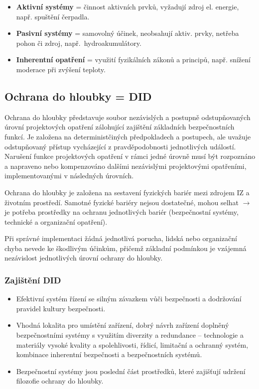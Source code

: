\begin{itemize}
    \item \textbf{Aktivní systémy} = činnost aktivních prvků, vyžadují zdroj el. energie, např. spuštění čerpadla.
    \item  \textbf{Pasivní systémy} = samovolný účinek, neobsahují aktiv. prvky, netřeba pohon či zdroj, např.~hydroakumulátory.
    \item  \textbf{Inherentní opatření} = využití fyzikálních zákonů a principů, např. snížení moderace při zvýšení teploty.
\end{itemize}

\subsection{Ochrana do hloubky = DID}

Ochrana do hloubky představuje soubor nezávislých a postupně odstupňovaných úrovní projektových opatření zálohující zajištění základních bezpečnostních funkcí. Je založena na deterministčiných předpokladech a postupech, ale uvažuje odstupňovaný přístup vycházející z pravděpodobnosti jednotlivých událostí. Narušení funkce projektových opatření v rámci jedné úrovně musí být rozpoznáno a napraveno nebo kompenzováno dalšími nezávislými projektovými opatřeními, implementovanými v následných úrovních.

Ochrana do hloubky je založena na sestavení fyzických bariér mezi zdrojem IZ a životním prostředí. Samotné fyzické bariéry nejsou dostatečné, mohou selhat $\rightarrow$ je potřeba prostředky na ochranu jednotlivých bariér (bezpečnostní systémy, technické a organizační opatření).

Při správné implementaci žádná jednotlivá porucha, lidská nebo organizační chyba nevede ke škodlivým účinkům, přičemž základní podmínkou je vzájemná nezávislost jednotlivých úrovní ochrany do hloubky.

\subsubsection{Zajištění DID}

\begin{itemize}
    \item Efektivní systém řízení se silným závazkem vůči bezpečnosti a dodržování pravidel kultury bezpečnosti.
    \item Vhodná lokalita pro umístění zařízení, dobrý návrh zařízení doplněný bezpečnostními systémy s využitím diverzity a redundance -- technologie a materiály vysoké kvality a spolehlivosti, řídicí, limitační a ochranný systém, kombinace inherentní bezpečnosti a bezpečnostních systémů.
    \item Bezpečnostní systémy jsou poslední část prostředků, které zajišťují udržení filozofie ochrany do hloubky.
\end{itemize}

